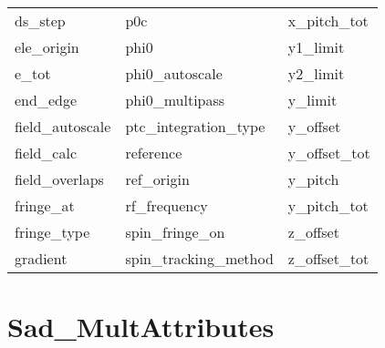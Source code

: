 \begin{tabular}{lll}
ds_step                     & p0c                         & x_pitch_tot                 \\
ele_origin                  & phi0                        & y1_limit                    \\
e_tot                       & phi0_autoscale              & y2_limit                    \\
end_edge                    & phi0_multipass              & y_limit                     \\
field_autoscale             & ptc_integration_type        & y_offset                    \\
field_calc                  & reference                   & y_offset_tot                \\
field_overlaps              & ref_origin                  & y_pitch                     \\
fringe_at                   & rf_frequency                & y_pitch_tot                 \\
fringe_type                 & spin_fringe_on              & z_offset                    \\
gradient                    & spin_tracking_method        & z_offset_tot                \\
 \bottomrule
 \end{tabular}
 \vfill
 
 \section{Sad_MultAttributes}
 \label{s:list.sad.mult}
 
